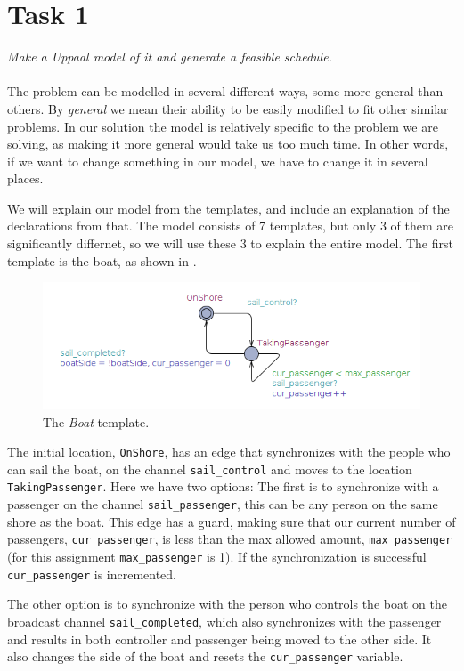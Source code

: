 \section{Task 1}
\label{sec:task1}
\textit{Make a Uppaal model of it and generate a feasible schedule.}\\\\
The problem can be modelled in several different ways, some more general than others. By \textit{general} we mean their ability to be easily modified to fit other similar problems. In our solution the model is relatively specific to the problem we are solving, as making it more general would take us too much time. In other words, if we want to change something in our model, we have to change it in several places.

We will explain our model from the templates, and include an explanation of the declarations from that. The model consists of 7 templates, but only 3 of them are significantly differnet, so we will use these 3 to explain the entire model. The first template is the boat, as shown in .

\begin{figure}[H] \centering
	\includegraphics[width=1\textwidth]{Images/boat.png}
	\caption{The \textit{Boat} template.}\label{fig:boat}
\end{figure} 

\noindent The initial location, \texttt{OnShore}, has an edge that synchronizes with the people who can sail the boat, on the channel \texttt{sail_control} and moves to the location \texttt{TakingPassenger}. Here we have two options: The first is to synchronize with a passenger on the channel \texttt{sail_passenger}, this can be any person on the same shore as the boat. This edge has a guard, making sure that our current number of passengers, \texttt{cur_passenger}, is less than the max allowed amount, \texttt{max_passenger} (for this assignment \texttt{max_passenger} is 1). If the synchronization is successful \texttt{cur_passenger} is incremented. 

The other option is to synchronize with the person who controls the boat on the broadcast channel \texttt{sail_completed}, which also synchronizes with the passenger and results in both controller and passenger being moved to the other side. It also changes the side of the boat and resets the \texttt{cur_passenger} variable.

